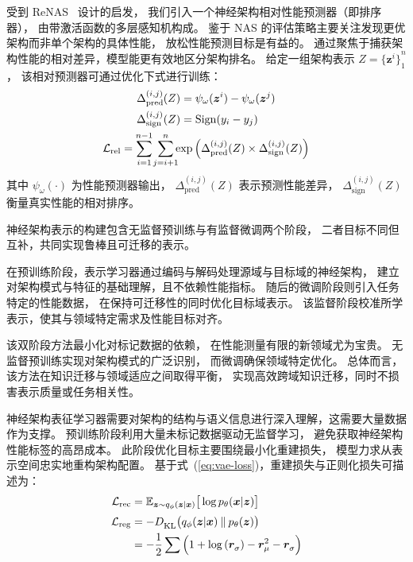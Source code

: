 \documentclass[../main.tex]{subfiles}
\begin{document}
受到 ReNAS~\cite{DBLP:conf/cvpr/Xu00TJX021} 设计的启发，
我们引入一个神经架构相对性能预测器（即排序器），
由带激活函数的多层感知机构成。
鉴于 NAS 的评估策略主要关注发现更优架构而非单个架构的具体性能，
放松性能预测目标是有益的。
通过聚焦于捕获架构性能的相对差异，模型能更有效地区分架构排名。
给定一组架构表示 $ Z = {\{ \bm{z}^{i} \}}_{1}^{n} $，
该相对预测器可通过优化下式进行训练：
\begin{gather}
	\begin{aligned}
		\Delta_{\mathrlap{\mathrm{pred}}}^{(i,j)}(Z) & = \psi_{\omega}(\bm{z}^i) - \psi_{\omega}(\bm{z}^j) \\
		\Delta_{\mathrlap{\mathrm{sign}}}^{(i,j)}(Z) & = \mathrm{Sign}(y_i-y_j)
	\end{aligned} \notag \\
	\mathcal{L}_\mathrm{rel} = \sum_{\mathclap{i=1}}^{n-1}{\;\sum_{\mathclap{j=i+1}}^{n}{\exp{\left( \Delta_\mathrm{pred}^{(i,j)}(Z) \times \Delta_\mathrm{sign}^{(i,j)}(Z)\right)}}}
\end{gather}
其中 $ \psi_\omega(\cdot) $ 为性能预测器输出，
$ \Delta_{\mathrm{pred}}^{(i,j)}(Z) $ 表示预测性能差异，
$ \Delta_{\mathrm{sign}}^{(i,j)}(Z) $ 衡量真实性能的相对排序。


神经架构表示的构建包含无监督预训练与有监督微调两个阶段，
二者目标不同但互补，共同实现鲁棒且可迁移的表示。

在预训练阶段，表示学习器通过编码与解码处理源域与目标域的神经架构，
建立对架构模式与特征的基础理解，且不依赖性能指标。
随后的微调阶段则引入任务特定的性能数据，
在保持可迁移性的同时优化目标域表示。
该监督阶段校准所学表示，使其与领域特定需求及性能目标对齐。

该双阶段方法最小化对标记数据的依赖，
在性能测量有限的新领域尤为宝贵。
无监督预训练实现对架构模式的广泛识别，
而微调确保领域特定优化。
总体而言，该方法在知识迁移与领域适应之间取得平衡，
实现高效跨域知识迁移，同时不损害表示质量或任务相关性。


神经架构表征学习器需要对架构的结构与语义信息进行深入理解，这需要大量数据作为支撑。
预训练阶段利用大量未标记数据驱动无监督学习，
避免获取神经架构性能标签的高昂成本。
此阶段优化目标主要围绕最小化重建损失，
模型力求从表示空间忠实地重构架构配置。
基于式~(\ref{eq:vae-loss})，重建损失与正则化损失可描述为：
\begin{align}
	\mathcal{L}_\mathrm{rec} & = \mathbb{E}_{\bm{z} \sim q_{\phi}(\bm{z}|\bm{x})}{\big[\log{p_\theta(\bm{x}|\bm{z})}\big]}                                   \\
	\mathcal{L}_\mathrm{reg} & = {-}D^{\mathstrut}_\mathrm{KL}\big(q_\phi(\bm{z}|\bm{x})\:\|\:p_\theta(\bm{z})\big) \notag                                   \\
	{}                       & = {-}\frac{1}{2}\sum{\left({1+\log{(\bm{r}^{\mathstrut}_{\sigma}) - \bm{r}_{\mu}^{2} - \bm{r}^{\mathstrut}_{\sigma}}}\right)}
\end{align}
\end{document}
